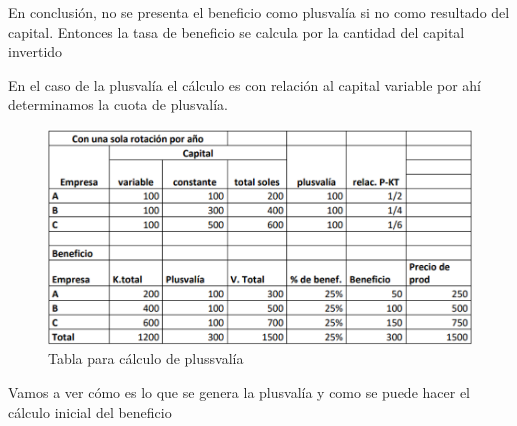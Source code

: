 \documentclass[
  a4paper,
]{article}
\begin{document}
En conclusión, no se presenta el beneficio como plusvalía si no como
resultado del capital. Entonces la tasa de beneficio se calcula por la
cantidad del capital invertido

En el caso de la plusvalía el cálculo es con relación al capital
variable por ahí determinamos la cuota de plusvalía.

\begin{figure}

\caption{\label{fig-figura1}Tabla para cálculo de plussvalía}

{\centering \includegraphics{Figura1.png}

}

\end{figure}

Vamos a ver cómo es lo que se genera la plusvalía y como se puede hacer
el cálculo inicial del beneficio
\end{document}
